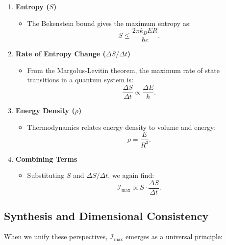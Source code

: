 \documentclass[12pt]{article}
\begin{document}
\begin{enumerate}
    \item \textbf{Entropy (\(S\))}
    \begin{itemize}
        \item The Bekenstein bound gives the maximum entropy as:
        \[
        S \leq \frac{2\pi k_B E R}{\hbar c}.
        \]
    \end{itemize}

    \item \textbf{Rate of Entropy Change (\(\Delta S / \Delta t\))}
    \begin{itemize}
        \item From the Margolus-Levitin theorem, the maximum rate of state transitions in a quantum system is:
        \[
        \frac{\Delta S}{\Delta t} \propto \frac{\Delta E}{\hbar}.
        \]
    \end{itemize}

    \item \textbf{Energy Density (\(\rho\))}
    \begin{itemize}
        \item Thermodynamics relates energy density to volume and energy:
        \[
        \rho = \frac{E}{R^3}.
        \]
    \end{itemize}

    \item \textbf{Combining Terms}
    \begin{itemize}
        \item Substituting \(S\) and \(\Delta S / \Delta t\), we again find:
        \[
        \mathcal{I}_{\text{max}} \propto S \cdot \frac{\Delta S}{\Delta t}.
        \]
    \end{itemize}
\end{enumerate}

\subsection{Synthesis and Dimensional Consistency}
When we unify these perspectives, \(\mathcal{I}_{\text{max}}\) emerges as a universal principle:
\end{document}
